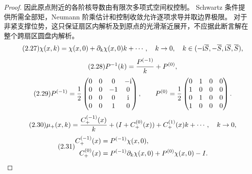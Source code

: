 \begin{proof}
因此原点附近的各阶核导数由有限次多项式空间权控制。
Schwartz 条件提供所需全部矩，Neumann 阶乘估计和控制收敛允许逐项求导并取边界极限。
对于非紧支撑位势，这只保证扇区内解析及到原点的光滑渐近展开，不应据此断言解在整个跨扇区圆盘内解析。
\begin{equation}
\originaleq{2.27}
\chi(x,k)=\chi(x,0)+\partial_k\chi(x,0)k+\cdots,
\quad k\to0,\quad k\in(-\ii\overline S,-\overline S,\ii\overline S,\overline S),
\end{equation}
\begin{equation}
\originaleq{2.28}
P^{-1}(k)=\dfrac{P^{(-1)}}{k}+P^{(0)},
\end{equation}
\begin{equation}
\originaleq{2.29}
P^{(-1)}=\dfrac{1}{2}\begin{pmatrix}0&0&0&-\ii\\0&0&-1&0\\0&0&0&\ii\\0&0&1&0\end{pmatrix},\qquad
P^{(0)}=\dfrac{1}{2}\begin{pmatrix}0&1&0&0\\1&0&0&0\\0&1&0&0\\1&0&0&0\end{pmatrix}.
\end{equation}
\begin{equation}
\originaleq{2.30}
\mu_+(x,k)=\dfrac{C_+^{(-1)}(x)}{k}+(I+C_+^{(0)}(x))+C_+^{(1)}(x)k+\cdots,
\quad k\to0,
\end{equation}
\begin{equation}
\originaleq{2.31}
\begin{aligned}
C_+^{(-1)}(x)&=P^{(-1)}\chi(x,0),\\
C_+^{(0)}(x)&=P^{(-1)}\partial_k\chi(x,0)+P^{(0)}\chi(x,0)-I.
\end{aligned}
\end{equation}

\end{proof}
